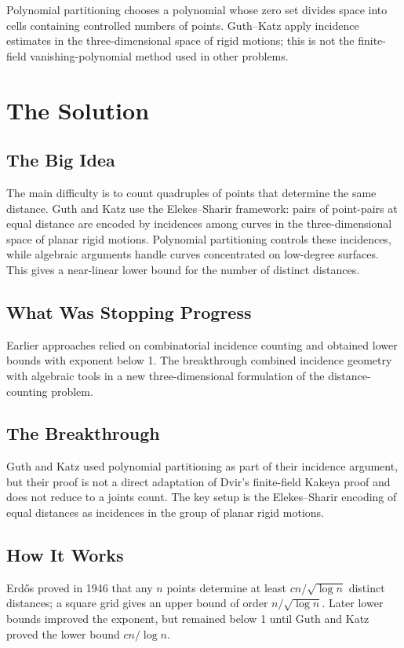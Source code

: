 Polynomial partitioning chooses a polynomial whose zero set divides space into cells containing controlled numbers of points. Guth--Katz apply incidence estimates in the three-dimensional space of rigid motions; this is not the finite-field vanishing-polynomial method used in other problems.

\section{The Solution}

\subsection{The Big Idea}
The main difficulty is to count quadruples of points that determine the same distance. Guth and Katz use the Elekes--Sharir framework: pairs of point-pairs at equal distance are encoded by incidences among curves in the three-dimensional space of planar rigid motions. Polynomial partitioning controls these incidences, while algebraic arguments handle curves concentrated on low-degree surfaces. This gives a near-linear lower bound for the number of distinct distances.

\subsection{What Was Stopping Progress}
Earlier approaches relied on combinatorial incidence counting and obtained lower bounds with exponent below 1. The breakthrough combined incidence geometry with algebraic tools in a new three-dimensional formulation of the distance-counting problem.

\subsection{The Breakthrough}
Guth and Katz used polynomial partitioning as part of their incidence argument, but their proof is not a direct adaptation of Dvir's finite-field Kakeya proof and does not reduce to a joints count. The key setup is the Elekes--Sharir encoding of equal distances as incidences in the group of planar rigid motions.

\subsection{How It Works}

Erd\H{o}s proved in 1946 that any $n$ points determine at least $cn/\sqrt{\log n}$ distinct distances; a square grid gives an upper bound of order $n/\sqrt{\log n}$. Later lower bounds improved the exponent, but remained below 1 until Guth and Katz proved the lower bound $cn/\log n$.

